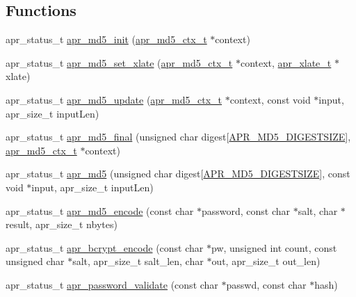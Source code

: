 \subsection*{Functions}
\begin{DoxyCompactItemize}
\item 
apr\-\_\-status\-\_\-t \hyperlink{group___a_p_r___m_d5_ga7a0502bfc466821beabe4876987fbcb5}{apr\-\_\-md5\-\_\-init} (\hyperlink{structapr__md5__ctx__t}{apr\-\_\-md5\-\_\-ctx\-\_\-t} $\ast$context)
\item 
apr\-\_\-status\-\_\-t \hyperlink{group___a_p_r___m_d5_gad80cbd97ca3197a237bbed006c033a57}{apr\-\_\-md5\-\_\-set\-\_\-xlate} (\hyperlink{structapr__md5__ctx__t}{apr\-\_\-md5\-\_\-ctx\-\_\-t} $\ast$context, \hyperlink{group___a_p_r___x_l_a_t_e_ga069dabbadc30e3a4157c38104a250e77}{apr\-\_\-xlate\-\_\-t} $\ast$xlate)
\item 
apr\-\_\-status\-\_\-t \hyperlink{group___a_p_r___m_d5_ga1ae4e5c171ae98953e716ac02f026ed2}{apr\-\_\-md5\-\_\-update} (\hyperlink{structapr__md5__ctx__t}{apr\-\_\-md5\-\_\-ctx\-\_\-t} $\ast$context, const void $\ast$input, apr\-\_\-size\-\_\-t input\-Len)
\item 
apr\-\_\-status\-\_\-t \hyperlink{group___a_p_r___m_d5_ga245fb83991257b096ebadd2b1b8cef62}{apr\-\_\-md5\-\_\-final} (unsigned char digest\mbox{[}\hyperlink{group___a_p_r___m_d5_ga0bb65e74ccdddca6ef75e886084e52dc}{A\-P\-R\-\_\-\-M\-D5\-\_\-\-D\-I\-G\-E\-S\-T\-S\-I\-Z\-E}\mbox{]}, \hyperlink{structapr__md5__ctx__t}{apr\-\_\-md5\-\_\-ctx\-\_\-t} $\ast$context)
\item 
apr\-\_\-status\-\_\-t \hyperlink{group___a_p_r___m_d5_gac98c04b75053ae04907ca325f46df955}{apr\-\_\-md5} (unsigned char digest\mbox{[}\hyperlink{group___a_p_r___m_d5_ga0bb65e74ccdddca6ef75e886084e52dc}{A\-P\-R\-\_\-\-M\-D5\-\_\-\-D\-I\-G\-E\-S\-T\-S\-I\-Z\-E}\mbox{]}, const void $\ast$input, apr\-\_\-size\-\_\-t input\-Len)
\item 
apr\-\_\-status\-\_\-t \hyperlink{group___a_p_r___m_d5_gaf902e64b62e4056c6dcc1594b2dca645}{apr\-\_\-md5\-\_\-encode} (const char $\ast$password, const char $\ast$salt, char $\ast$result, apr\-\_\-size\-\_\-t nbytes)
\item 
apr\-\_\-status\-\_\-t \hyperlink{group___a_p_r___m_d5_ga9a82cd796a9a185c467b60f3a142dad2}{apr\-\_\-bcrypt\-\_\-encode} (const char $\ast$pw, unsigned int count, const unsigned char $\ast$salt, apr\-\_\-size\-\_\-t salt\-\_\-len, char $\ast$out, apr\-\_\-size\-\_\-t out\-\_\-len)
\item 
apr\-\_\-status\-\_\-t \hyperlink{group___a_p_r___m_d5_ga9ea1aa7e468de57e603d6e1d1b1516f2}{apr\-\_\-password\-\_\-validate} (const char $\ast$passwd, const char $\ast$hash)
\end{DoxyCompactItemize}


